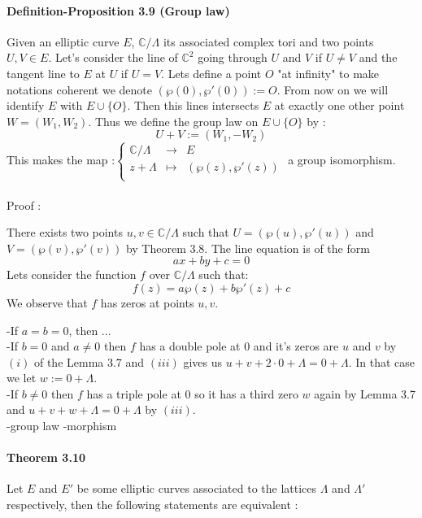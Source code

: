 \documentclass[letterpaper,10pt]{article}
\begin{document}
\paragraph{Definition-Proposition 3.9 (Group law)} Given an elliptic curve $E$, $\mathbb{C}/\Lambda$ its associated complex tori and two points $U,V \in E$. Let's consider the line of $\mathbb{C}^2$ going 
through $U$ and $V$ if $U \neq V$ and the tangent line to $E$ at $U$ if $U=V$. Lets define a point $O$ "at infinity" to make notations coherent
 we denote $(\wp(0),\wp'(0)) := O$. From now on we will identify $E$ with $E\cup \{O\}$.
Then this lines intersects $E$ at exactly one other point $W = (W_1,W_2)$.
Thus we define the group law on $E\cup\{O\}$ by : \[ U + V :=(W_1,-W_2) \]
This makes the map :$  \left\{ \begin{array}{rcl} \mathbb{C}/\Lambda & \longrightarrow & E \\
  z + \Lambda & \longmapsto & (\wp(z),\wp'(z)) \\ \end{array} \right. $ a group isomorphism.

{\itshape \paragraph{} Proof :}
There exists two points $u,v\in\mathbb{C}/\Lambda $ such that $U=(\wp(u),\wp'(u))$ and $ V = (\wp(v),\wp'(v))$ by Theorem 3.8.
The line equation is of the form \[ ax + by + c = 0  \]
Lets consider the function $f$ over $\mathbb{C}/\Lambda$ such that: \[ f(z) = a\wp(z) + b\wp'(z) + c \]
We observe that $f$ has zeros at points $u,v$.

-If $a = b = 0$, then ...\\
-If $b=0$ and $a \neq 0$ then $f$ has a double pole at 0 and it's zeros are $u$ and $v$ by $(i)$ of the Lemma 3.7 
and $(iii)$ gives us  $u + v + 2 \cdot 0 + \Lambda =0 + \Lambda $. In that case we let $w:= 0 + \Lambda$.\\
-If $b\neq 0$ then $f$ has a triple pole at 0 so it has a third zero $w$ again by Lemma 3.7 and $u + v + w + \Lambda = 0 + \Lambda$ by $(iii)$. \\
-group law
-morphism

\paragraph{Theorem 3.10} Let $E$ and $E'$ be some elliptic curves associated to the lattices $\Lambda$ and $\Lambda'$ respectively,
then the following statements are equivalent :\\
\end{document}
